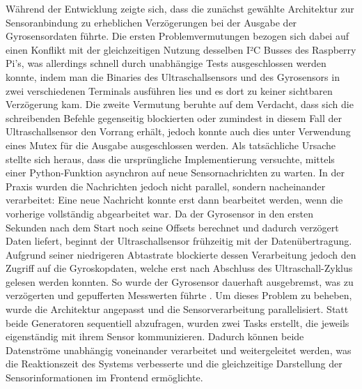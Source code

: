 Während der Entwicklung zeigte sich, dass die zunächst gewählte Architektur zur Sensoranbindung zu erheblichen Verzögerungen bei der Ausgabe der Gyrosensordaten führte. Die ersten Problemvermutungen bezogen sich dabei auf einen Konflikt mit der gleichzeitigen Nutzung desselben I²C Busses des Raspberry Pi's, was allerdings schnell durch unabhängige Tests ausgeschlossen werden konnte, indem man die Binaries des Ultraschallsensors und des Gyrosensors in zwei verschiedenen Terminals ausführen lies und es dort zu keiner sichtbaren Verzögerung kam.
Die zweite Vermutung beruhte auf dem Verdacht, dass sich die schreibenden Befehle gegenseitig blockierten oder zumindest in diesem Fall der Ultraschallsensor den Vorrang erhält, jedoch konnte auch dies unter Verwendung eines Mutex für die Ausgabe ausgeschlossen werden.
Als tatsächliche Ursache stellte sich heraus, dass die ursprüngliche Implementierung versuchte, mittels einer Python-Funktion asynchron auf neue Sensornachrichten zu warten. In der Praxis wurden die Nachrichten jedoch nicht parallel, sondern nacheinander verarbeitet: Eine neue Nachricht konnte erst dann bearbeitet werden, wenn die vorherige vollständig abgearbeitet war. Da der Gyrosensor in den ersten Sekunden nach dem Start noch seine Offsets berechnet und dadurch verzögert Daten liefert, beginnt der Ultraschallsensor frühzeitig mit der Datenübertragung. 
Aufgrund seiner niedrigeren Abtastrate blockierte dessen Verarbeitung jedoch den Zugriff auf die Gyroskopdaten, welche erst nach Abschluss des Ultraschall-Zyklus gelesen werden konnten. So wurde der Gyrosensor dauerhaft ausgebremst, was zu verzögerten und gepufferten Messwerten führte \cite{webserver_python_anext}.
Um dieses Problem zu beheben, wurde die Architektur angepasst und die Sensorverarbeitung parallelisiert. Statt beide Generatoren sequentiell abzufragen, wurden zwei Tasks erstellt, die jeweils eigenständig mit ihrem Sensor kommunizieren. Dadurch können beide Datenströme unabhängig voneinander verarbeitet und weitergeleitet werden, was die Reaktionszeit des Systems verbesserte und die gleichzeitige Darstellung der Sensorinformationen im Frontend ermöglichte.

